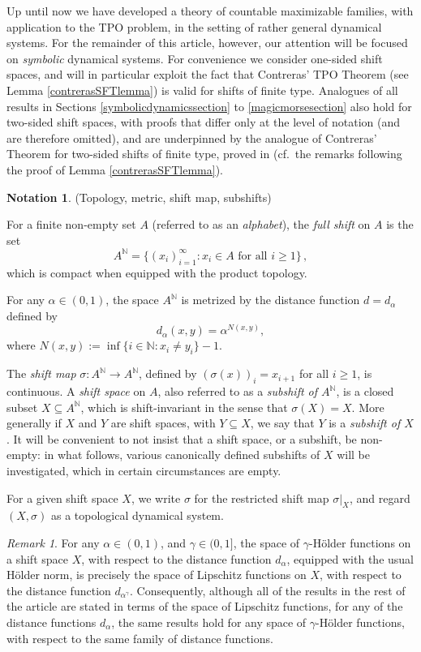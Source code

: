 \documentclass[reqno,11pt]{amsart}
\theoremstyle{definition}
\newtheorem{notation}[thm]{Notation}
\theoremstyle{remark}
\theoremstyle{remark}
\newtheorem{rem}[thm]{Remark}
\def \N {\mathbb N}
\numberwithin{equation}{section}
\begin{document}
Up until now we have developed a theory of countable maximizable families, with application to the TPO problem,
in the setting of rather general dynamical systems.
For the remainder of this article, however, our attention will be focused on \emph{symbolic} dynamical systems.
For convenience we consider one-sided shift spaces, and will in particular
exploit the fact that Contreras' TPO Theorem
(see Lemma \ref{contrerasSFTlemma}) is valid for shifts of finite type.
Analogues of all results in Sections \ref{symbolicdynamicssection} to \ref{magicmorsesection}
also hold for two-sided shift spaces, with proofs that differ only at the level of notation (and
are therefore omitted), and are underpinned by the analogue of Contreras' Theorem for two-sided shifts of finite type,
proved in \cite{HLMXZ19} (cf.~the remarks following the proof of Lemma \ref{contrerasSFTlemma}).

\begin{notation}\label{shift_space_notation} (Topology, metric, shift map, subshifts)

For a finite non-empty set $A$ (referred to as an \emph{alphabet}), the \emph{full shift} on $A$ is the set 
$$A^\N=\{ (x_i)_{i=1}^\infty : x_i\in A\text{ for all }i\ge 1\}\,,$$ 
which is compact when equipped with the product topology.

For any $\alpha\in(0,1)$, 
the space $A^\N$ is metrized by the distance function
$d=d_\alpha$ defined by
$$d_\alpha(x,y)=\alpha^{N(x,y)},$$
where $N(x,y):=\inf\{i\in\N: x_i \neq y_i \} -1$.


The \emph{shift map} $\sigma: A^\N\to A^\N$, defined by $(\sigma(x))_i=x_{i+1}$ for all $i\ge1$, is continuous.
A \emph{shift space} on $A$, also referred to as a \emph{subshift of $A^\N$}, is a closed 
subset
$X\subseteq A^\N$, which is shift-invariant in the sense that $\sigma(X)=X$.
More generally if $X$ and $Y$ are shift spaces, with $Y\subseteq X$, we say that $Y$ is a \emph{subshift of $X$}.
It will be convenient to not insist that a shift space, or a subshift, be non-empty: in what follows, various 
canonically defined subshifts of $X$ will be investigated, which in certain circumstances are empty.


For a given shift space $X$, we write $\sigma$ for the restricted shift map $\sigma|_X$,
and
 regard $(X,\sigma)$ as a topological dynamical system.
\end{notation}


\begin{rem}
For any $\alpha\in(0,1)$, and $\gamma\in(0,1]$, the space of $\gamma$-H\"older functions on a shift space $X$,
with respect to the distance function $d_\alpha$, equipped with the usual H\"older norm, is precisely the space of Lipschitz
functions on $X$, with respect to the distance function $d_{\alpha^\gamma}$.
Consequently, although all of the results in the rest of the article are stated in terms of the space of Lipschitz functions,
for any of the distance functions $d_\alpha$, the same results hold for any space of $\gamma$-H\"older functions, 
with respect to the same family of distance functions.
\end{rem}
\end{document}
